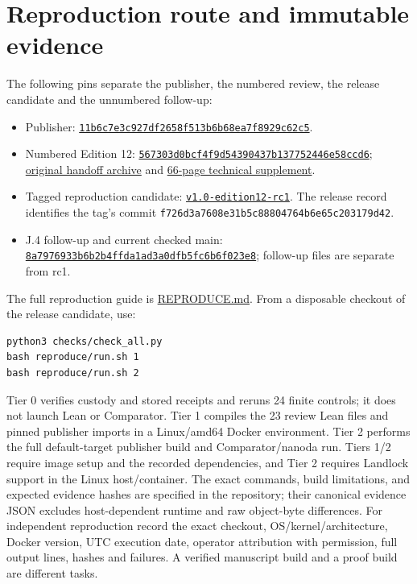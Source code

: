 \documentclass[11pt,letterpaper]{article}
\theoremstyle{definition}\newtheorem{definition}[theorem]{Definition}\newtheorem{example}[theorem]{Example}
\theoremstyle{remark}\newtheorem{remark}[theorem]{Remark}
\newcommand{\aud}[2]{\href{https://github.com/nousentllc/VP-VNP-Review/blob/567303d0bcf4f9d54390437b137752446e58ccd6/#1}{#2}}
\newcommand{\follow}[2]{\href{https://github.com/nousentllc/VP-VNP-Review/blob/8a7976933b6b2b4ffda1ad3a0dfb5fc6b6f023e8/#1}{#2}}
\begin{document}
\section{Reproduction route and immutable evidence}\label{sec:repro}
The following pins separate the publisher, the numbered review, the release candidate and the unnumbered follow-up:
\begin{itemize}[leftmargin=1.7em]
\item Publisher: \href{https://github.com/anthropics/formal-math/tree/11b6c7e3c927df2658f513b6b68ea7f8929c62c5/vp-vnp}{\nolinkurl{11b6c7e3c927df2658f513b6b68ea7f8929c62c5}}.
\item Numbered Edition 12: \href{https://github.com/nousentllc/VP-VNP-Review/tree/567303d0bcf4f9d54390437b137752446e58ccd6}{\nolinkurl{567303d0bcf4f9d54390437b137752446e58ccd6}}; \aud{handoff/VP_VNP_Review_2026-11-25_pass15.zip}{original handoff archive} and \aud{report/VP_VNP_Research_Review.pdf}{66-page technical supplement}.
\item Tagged reproduction candidate: \href{https://github.com/nousentllc/VP-VNP-Review/tree/v1.0-edition12-rc1}{\texttt{v1.0-edition12-rc1}}. The release record identifies the tag's commit \nolinkurl{f726d3a7608e31b5c88804764b6e65c203179d42}.
\item J.4 follow-up and current checked main: \href{https://github.com/nousentllc/VP-VNP-Review/tree/8a7976933b6b2b4ffda1ad3a0dfb5fc6b6f023e8}{\nolinkurl{8a7976933b6b2b4ffda1ad3a0dfb5fc6b6f023e8}}; follow-up files are separate from rc1.
\end{itemize}
The full reproduction guide is \follow{REPRODUCE.md}{REPRODUCE.md}. From a disposable checkout of the release candidate, use:
\begin{verbatim}
python3 checks/check_all.py
bash reproduce/run.sh 1
bash reproduce/run.sh 2
\end{verbatim}
Tier 0 verifies custody and stored receipts and reruns 24 finite controls; it does not launch Lean or Comparator. Tier 1 compiles the 23 review Lean files and pinned publisher imports in a Linux/amd64 Docker environment. Tier 2 performs the full default-target publisher build and Comparator/nanoda run. Tiers 1/2 require image setup and the recorded dependencies, and Tier 2 requires Landlock support in the Linux host/container. The exact commands, build limitations, and expected evidence hashes are specified in the repository; their canonical evidence JSON excludes host-dependent runtime and raw object-byte differences. For independent reproduction record the exact checkout, OS/kernel/architecture, Docker version, UTC execution date, operator attribution with permission, full output lines, hashes and failures. A verified manuscript build and a proof build are different tasks.
\end{document}
